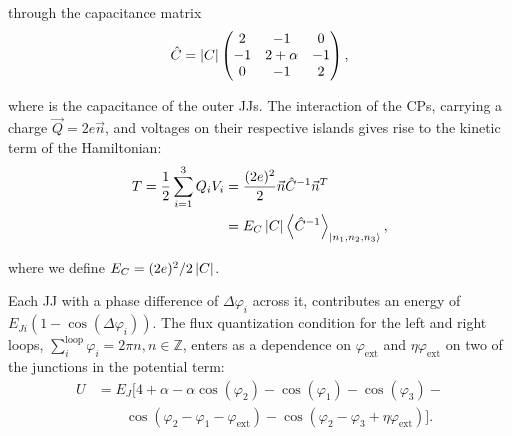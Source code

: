 \noindent through the capacitance matrix
\begin{equation}
  \label{eq:capac}
  \hat{C} = \left|C\right| \begin{pmatrix}
    2  &  -1  &  0\\
    -1  &  2  +  \alpha  &  -1\\
    0  &  -1  & 2
  \end{pmatrix},
\end{equation}

\noindent where   is the capacitance  of the outer  JJs.  The interaction of  the CPs,
carrying a charge $  \vec{Q}=2e\vec{n} $, and voltages on their  respective islands gives rise
to the kinetic term of the Hamiltonian:
\begin{equation}\label{eq:kinetic}
  \begin{aligned}
    T = \frac{1}{2}\sum_{i=1}^{3}Q_iV_i & =
    \frac{(2e)^2}{2}\vec{n}\hat{C}^{-1}\vec{n}^{T}\\
    & = E_C \left|C\right| \left\langle \hat{C}^{-1} \right\rangle_{\Ket{n_{1}, n_2, n_3}},
  \end{aligned}
\end{equation}

\noindent where we define $ E_{C}={(2e)^{2}}/{2 \left|C\right| } $.

Each  JJ  with  a   phase  difference  of  $\Delta\varphi_{i}$  across  it,   contributes  an  energy  of
$ E_{Ji}\left(1 - \cos(\Delta\varphi_i)\right) $.  The flux quantization condition for the left and right
loops,  $  \sum_{i}^{\text{loop}} \varphi_i  =  2\pi  n,  n \in  \mathbb{Z}$,  enters  as a  dependence  on
$ \varphi_\text{ext} $ and $ \eta\varphi_\text{ext} $ on two of the junctions in the potential term:
\begin{equation}\label{eq:potential}
  \begin{aligned}
    U & = E_J\big[4 + \alpha - \alpha\cos(\varphi_{2}) -\cos(\varphi_{1}) -\cos(\varphi_{3}) - \\
    & \qquad \cos(\varphi_{2} - \varphi_{1} - \varphi_{\text{ext}}) - \cos(\varphi_{2} - \varphi_{3} + \eta\varphi_{\text{ext}})\big].
  \end{aligned}
\end{equation}

